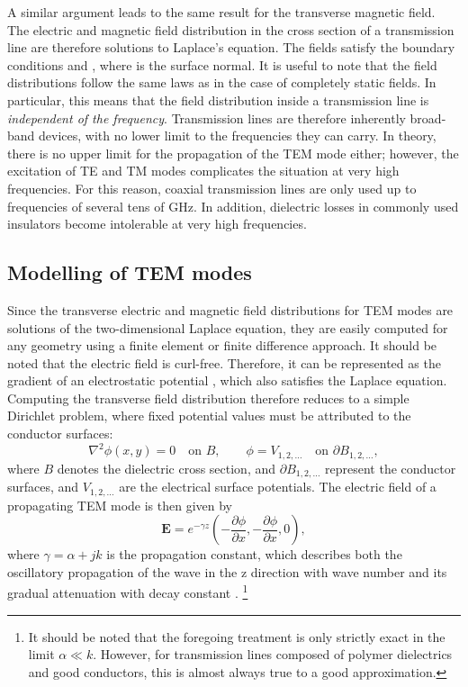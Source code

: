 A similar argument leads to the same result for the transverse magnetic
field. The electric and magnetic field distribution in the cross section
of a transmission line are therefore solutions to Laplace's equation.
The fields satisfy the boundary conditions
 and ,
where  is the surface normal. It is useful to note that
the field distributions follow the same laws as in the case of
completely static fields. In particular, this means that the field
distribution inside a transmission line is
\textit{independent of the frequency}. Transmission lines are therefore
inherently broad-band devices, with no lower limit to the frequencies
they can carry. In theory, there is no upper limit for the propagation
of the TEM mode either; however, the excitation of TE and TM modes
complicates the situation at very high frequencies. For this reason,
coaxial transmission lines are only used up to frequencies of several
tens of GHz. In addition, dielectric losses in commonly used insulators
become intolerable at very high frequencies. 

\subsection{Modelling of TEM modes}\label{modelling-of-tem-modes}

Since the transverse electric and magnetic field distributions for TEM
modes are solutions of the two-dimensional Laplace equation, they are
easily computed for any geometry using a finite element or finite
difference approach. It should be noted that the electric field is
curl-free. Therefore, it can be represented as the gradient of an
electrostatic potential , which also satisfies the Laplace
equation. Computing the transverse field distribution therefore reduces
to a simple Dirichlet problem, where fixed potential values must be
attributed to the conductor surfaces:
%
\begin{equation}
\nabla^2 \phi(x,y)=0 \quad\text{on }B, \qquad \phi=V_{1,2,\dots}\quad\text{on } \partial B_{1,2,\dots}, 
\end{equation}
where $B$ denotes the dielectric cross section, and $\partial B_{1,2,\dots}$
represent the conductor surfaces, and $V_{1,2,\dots}$ are the electrical
surface potentials.
The electric field of a propagating TEM mode is then given by
\begin{equation}
	\mathbf{E}=e^{-\gamma z} \left(-\frac{\partial\phi}{\partial x}, -\frac{\partial\phi}{\partial x},0\right),
\end{equation}
where $\gamma=\alpha+j k$ is the propagation constant, which describes both
the oscillatory propagation of the wave in the z direction with wave
number  and its gradual attenuation with decay constant \m{\alpha}.
\footnote{It should be noted that the foregoing treatment is only strictly exact in the 
limit $\alpha \ll k$. However, for transmission lines composed of polymer
dielectrics and good conductors, this is almost always true to a 
good approximation.}

